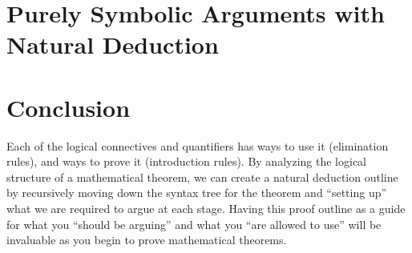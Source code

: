 \section{Purely Symbolic Arguments with Natural Deduction}


\section{Conclusion}

Each of the logical connectives and quantifiers has ways to use it (elimination rules), and ways to prove it (introduction rules).  By analyzing the logical structure of a mathematical theorem, we can create a natural deduction outline by recursively moving down the syntax tree for the theorem and ``setting up'' what we are required to argue at each stage.  Having this proof outline as a guide for what you ``should be arguing'' and what you ``are allowed to use'' will be invaluable as you begin to prove mathematical theorems.








